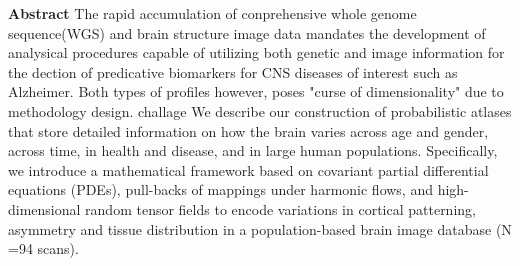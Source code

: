 \documentclass{article}
\begin{document}
\textbf{Abstract}
The rapid accumulation of conprehensive whole genome sequence(WGS) and brain structure image data mandates the development of analysical procedures capable of utilizing both genetic and image information for the dection of predicative biomarkers for CNS diseases of interest such as Alzheimer. Both types of profiles however, poses "curse of dimensionality" due to methodology design. challage We describe our construction of probabilistic atlases that store detailed information on how the brain varies across age and gender, across time, in health and disease, and in large human populations. Specifically, we introduce a mathematical framework based on covariant partial differential equations (PDEs), pull-backs of mappings under harmonic flows, and high-dimensional random tensor fields to encode variations in cortical patterning, asymmetry and tissue distribution in a population-based brain image database (N =94 scans).
\end{document}
